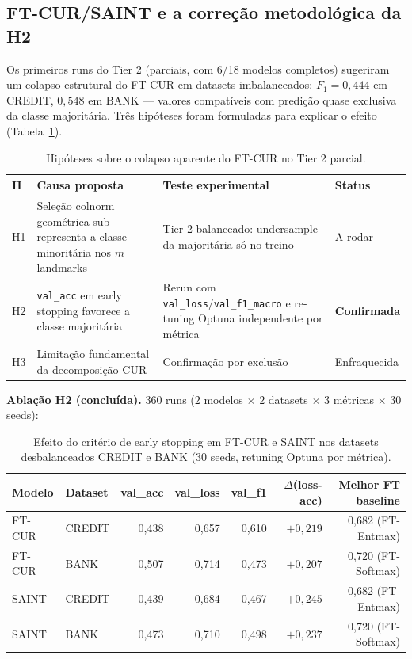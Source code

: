 \documentclass[12pt,a4paper]{article}
\begin{document}
\subsection{FT-CUR/SAINT e a correção metodológica da H2}
\label{sec:tier2_ftcur_limit}

Os primeiros runs do Tier 2 (parciais, com 6/18 modelos completos) sugeriram
um colapso estrutural do FT-CUR em datasets imbalanceados: $F_1 = 0{,}444$
em CREDIT, $0{,}548$ em BANK --- valores compatíveis com predição quase
exclusiva da classe majoritária. Três hipóteses foram formuladas para
explicar o efeito (Tabela~\ref{tab:hipoteses_ftcur}).

\begin{table}[H]
\centering
\caption{Hipóteses sobre o colapso aparente do FT-CUR no Tier 2 parcial.}
\label{tab:hipoteses_ftcur}
\small
\begin{tabular}{lp{4.2cm}p{4.8cm}l}
\toprule
\textbf{H} & \textbf{Causa proposta} & \textbf{Teste experimental} & \textbf{Status} \\
\midrule
H1 & Seleção colnorm geométrica
   sub-representa a classe minoritária nos $m$ landmarks
   & Tier 2 balanceado: undersample da majoritária só no treino
   & A rodar \\
\addlinespace
H2 & \texttt{val\_acc} em early stopping favorece a classe majoritária
   & Rerun com \texttt{val\_loss}/\texttt{val\_f1\_macro} e re-tuning Optuna
     independente por métrica
   & \textbf{Confirmada} \\
\addlinespace
H3 & Limitação fundamental da decomposição CUR
   & Confirmação por exclusão
   & Enfraquecida \\
\bottomrule
\end{tabular}
\end{table}

\textbf{Ablação H2 (concluída).} 360 runs ($2$ modelos $\times$ $2$ datasets
$\times$ $3$ métricas $\times$ $30$ seeds):

\begin{table}[H]
\centering
\caption{Efeito do critério de early stopping em FT-CUR e SAINT nos datasets
desbalanceados CREDIT e BANK (30 seeds, retuning Optuna por métrica).}
\label{tab:h2_results}
\begin{tabular}{llrrrrr}
\toprule
\textbf{Modelo} & \textbf{Dataset} & \textbf{val\_acc} & \textbf{val\_loss}
                & \textbf{val\_f1} & \textbf{$\Delta$(loss-acc)}
                & \textbf{Melhor FT baseline} \\
\midrule
FT-CUR & CREDIT & 0,438 & 0,657 & 0,610 & $+0,219$ & 0,682 (FT-Entmax) \\
FT-CUR & BANK   & 0,507 & 0,714 & 0,473 & $+0,207$ & 0,720 (FT-Softmax) \\
SAINT  & CREDIT & 0,439 & 0,684 & 0,467 & $+0,245$ & 0,682 (FT-Entmax) \\
SAINT  & BANK   & 0,473 & 0,710 & 0,498 & $+0,237$ & 0,720 (FT-Softmax) \\
\bottomrule
\end{tabular}
\end{table}
\end{document}
